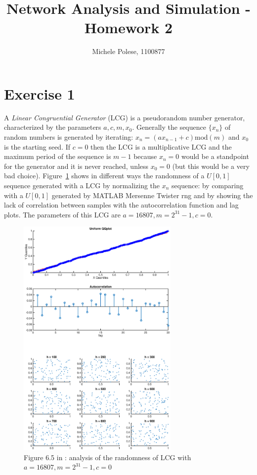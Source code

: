 \documentclass[10pt]{article}
\begin{document}
\title{Network Analysis and Simulation - Homework 2}
\author{Michele Polese, 1100877}

\maketitle

\section{Exercise 1}
A \textit{Linear Congruential Generator} (LCG) is a pseudorandom number generator, characterized by the parameters $a, c, m, x_0$. Generally the sequence $\{x_n\}$ of random numbers is generated by iterating: $x_n = (ax_{n-1} + c) \text{mod} (m)$ and $x_0$ is the starting seed. If $c = 0$ then the LCG is a multiplicative LCG and the maximum period of the sequence is $m-1$ because $x_n = 0$ would be a standpoint for the generator and it is never reached, unless $x_0 = 0$ (but this would be a very bad choice).
Figure~\ref{fig:65} shows in different ways the randomness of a $U[0,1]$ sequence generated with a LCG by normalizing the $x_n$ sequence: by comparing with a $U[0,1]$ generated by MATLAB Mersenne Twister rng and by showing the lack of correlation between samples with the autocorrelation function and lag plots. The parameters of this LCG are $a = 16807, m = 2^{31} - 1, c=0$.

\begin{figure}[h!]
  \centering
  \includegraphics[width=0.7\textwidth]{images/hw2_1_65}
  \caption{Figure 6.5 in \cite{leb}: analysis of the randomness of LCG with $a = 16807, m = 2^{31} - 1, c=0$}
  \label{fig:65}
\end{figure}
\end{document}
